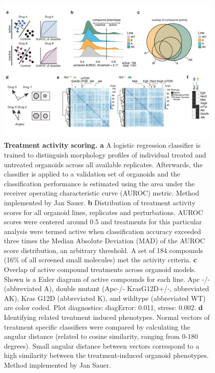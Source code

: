 \begin{flushleft}
\begin{figure}[h!]
\centering
\includegraphics[width=\textwidth,
                height=\textheight,
                keepaspectratio]{figures/adenomaprofiling/pdf/fig_1_5.pdf}
\caption{\textbf{Treatment activity scoring. a} A logistic regression classifier is trained to distinguish morphology profiles of individual treated and untreated organoids across all available replicates. Afterwards, the classifier is applied to a validation set of organoids and the classification performance is estimated using the area under the receiver operating characteristic curve (AUROC) metric. Method implemented by Jan Sauer.
\textbf{b} Distribution of treatment activity scores for all organoid lines, replicates and perturbations. AUROC scores were centered around 0.5 and treatments for this particular analysis were termed active when classification accuracy exceeded three times the Median Absolute Deviation (MAD) of the AUROC score distribution, an arbitrary threshold. A set of 184 compounds (16\% of all screened small molecules) met the activity criteria. 
\textbf{c} Overlap of active compound treatments across organoid models. Shown is a Euler diagram of active compounds for each line. Apc -/- (abbreviated A), double mutant (Apc-/- KrasG12D+/-, abbreviated AK), Kras G12D (abbreviated K), and wildtype (abbreviated WT) are color coded. Plot diagnostics: diagError: 0.011, stress: 0.002.
\textbf{d} Identifying related treatment induced phenotypes. Normal vectors of treatment specific classifiers were compared by calculating the angular distance (related to cosine similarity, ranging from 0-180 degrees). Small angular distance between vectors correspond to a high similarity between the treatment-induced organoid phenotypes. Method implemented by Jan Sauer.
}
\end{figure}
\end{flushleft}
